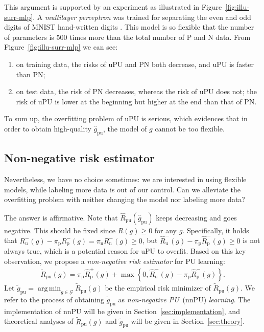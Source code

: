 \documentclass{article}
\DeclareMathOperator*{\argmin}{\mathrm{arg\,min}}
\newcommand{\cG}{\mathcal{G}}
\newcommand{\pip}{\pi_\mathrm{p}}
\newcommand{\pin}{\pi_\mathrm{n}}
\newcommand{\Rp}{R_\mathrm{p}}
\newcommand{\Rn}{R_\mathrm{n}}
\newcommand{\Ru}{R_\mathrm{u}}
\newcommand{\hRp}{\widehat{R}_\mathrm{p}}
\newcommand{\hRu}{\widehat{R}_\mathrm{u}}
\newcommand{\hRpu}{\widehat{R}_\mathrm{pu}}
\newcommand{\tRpu}{\widetilde{R}_\mathrm{pu}}
\newcommand{\hgpu}{\widehat{g}_\mathrm{pu}}
\newcommand{\tgpu}{\widetilde{g}_\mathrm{pu}}
\begin{document}
This argument is supported by an experiment as illustrated in Figure~\ref{fig:illu-surr-mlp}. A \emph{multilayer perceptron} was trained for separating the even and odd digits of MNIST hand-written digits \citep{lecun98mnist}. This model is so flexible that the number of parameters is 500 times more than the total number of P and N data. From Figure~\ref{fig:illu-surr-mlp} we can see:
\begin{enumerate}[label=(\Alph*)]
  \vspace{-1ex}%
  \item on training data, the risks of uPU and PN both decrease, and uPU is faster than PN;
  \item on test data, the risk of PN decreases, whereas the risk of uPU does not; the risk of uPU is lower at the beginning but higher at the end than that of PN.
  \vspace{-1ex}%
\end{enumerate}
To sum up, the overfitting problem of uPU is serious, which evidences that in order to obtain high-quality $\hgpu$, the model of $g$ cannot be too flexible.

\subsection{Non-negative risk estimator}

Nevertheless, we have no choice sometimes: we are interested in using flexible models, while labeling more data is out of our control. Can we alleviate the overfitting problem with neither changing the model nor labeling more data?

The answer is affirmative. Note that $\hRpu(\hgpu)$ keeps decreasing and goes negative. This should be fixed since $R(g)\ge0$ for any $g$. Specifically, it holds that $\Ru^-(g)-\pip\Rp^-(g)=\pin\Rn^-(g)\ge0$, but $\hRu^-(g)-\pip\hRp^-(g)\ge0$ is not always true, which is a potential reason for uPU to overfit. Based on this key observation, we propose a \emph{non-negative risk estimator} for PU learning:
\begin{align}
\label{eq:risk-pu-tilde}%
\tRpu(g)=\pip\hRp^+(g)+\max\left\{0,\hRu^-(g)-\pip\hRp^-(g)\right\}.
\end{align}
Let $\tgpu=\argmin\nolimits_{g\in\cG}\tRpu(g)$ be the empirical risk minimizer of $\tRpu(g)$. We refer to the process of obtaining $\tgpu$ as \emph{non-negative PU}~(nnPU) \emph{learning}. The implementation of nnPU  will be given in Section~\ref{sec:implementation}, and theoretical analyses of $\tRpu(g)$ and $\tgpu$ will be given in Section~\ref{sec:theory}.
\end{document}
